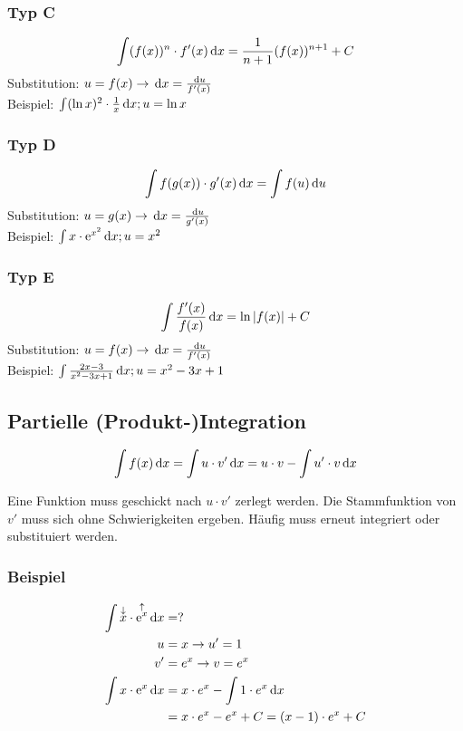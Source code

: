 \subsubsection{Typ C}
\begin{equation*}
	\int (f(x))^n \cdot f'(x) \,\mathrm dx = \frac{1}{n + 1} (f(x))^{n + 1} + C
\end{equation*}
Substitution: $u = f(x) \rightarrow \,\mathrm dx = \frac{\,\mathrm du}{f'(x)}$\\
Beispiel: $\int (\ln x)^2 \cdot \frac{1}{x} \,\mathrm dx; u = \ln x$

\subsubsection{Typ D}
\begin{equation*}
	\int f(g(x)) \cdot g'(x) \,\mathrm dx = \int f(u) \,\mathrm du
\end{equation*}
Substitution: $u = g(x) \rightarrow \,\mathrm dx = \frac{\,\mathrm du}{g'(x)}$\\
Beispiel: $\int x \cdot \mathrm e^{x^2} \,\mathrm dx; u = x^2$

\subsubsection{Typ E}
\begin{equation*}
	\int \frac{f'(x)}{f(x)} \,\mathrm dx = \ln |f(x)| + C
\end{equation*}
Substitution: $u = f(x) \rightarrow \,\mathrm dx = \frac{\,\mathrm du}{f'(x)}$\\
Beispiel: $\int \frac{2x - 3}{x^2 - 3x + 1} \,\mathrm dx; u = x^2 - 3x + 1$

\subsection{Partielle (Produkt-)Integration}
\begin{equation*}
	\int f(x) \,\mathrm dx = \int u \cdot v' \,\mathrm dx = u \cdot v - \int u' \cdot v \,\mathrm dx
\end{equation*}

Eine Funktion muss geschickt nach $u \cdot v'$ zerlegt werden. Die Stammfunktion von $v'$ muss sich ohne Schwierigkeiten ergeben.
Häufig muss erneut integriert oder substituiert werden.

\subsubsection{Beispiel}
\begin{align*}
	\int \overset{\downarrow}{x} \cdot \overset{\uparrow}{\mathrm e^x} \,\mathrm dx& = ?\\
	u& = x \rightarrow u' = 1\\
	v'& = e^x \rightarrow v = e^x\\
	\int x \cdot \mathrm e^x \,\mathrm dx& = x \cdot e^x - \int 1 \cdot e^x \,\mathrm dx\\
	& = x  \cdot e^x - e^x + C = (x - 1) \cdot e^x + C
\end{align*}
